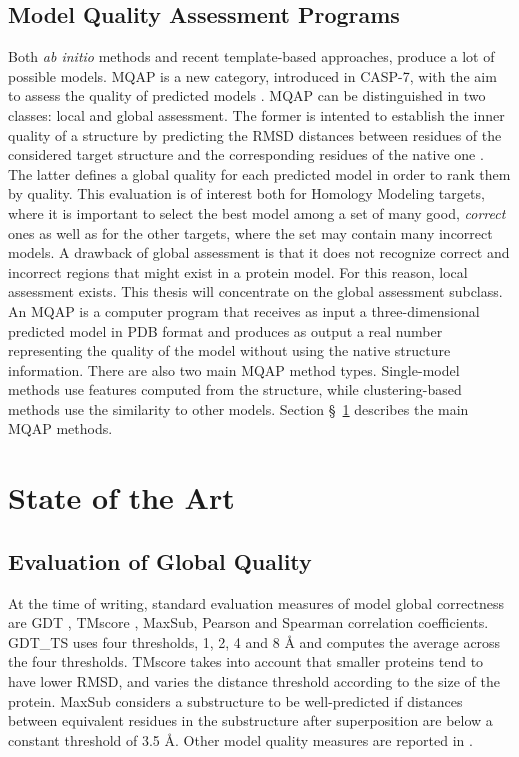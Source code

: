\subsection{Model Quality Assessment Programs}
\label{subsec:model_quality_assessment_programs}
Both \emph{ab initio} methods and recent template-based approaches, produce a lot of possible models. \gls{MQAP} is a new category, introduced in CASP-7, with the aim to assess the quality of predicted models \cite{Cozzetto2007aa}. MQAP can be distinguished in two classes: local and global assessment. The former is intented to establish the inner quality of a structure by predicting the RMSD distances between residues of the considered target structure and the corresponding residues of the native one \cite{DeRonne2008aa, Fasnacht2007aa}. The latter defines a global quality for each predicted model in order to rank them by quality. This evaluation is of interest both for Homology Modeling targets, where it is important to select the best model among a set of many good, \emph{correct} ones as well as for the other targets, where the set may contain many incorrect models. A drawback of global assessment is that it does not recognize correct and incorrect regions that might exist in a protein model. For this reason, local assessment exists. This thesis will concentrate on the global assessment subclass. An MQAP is a computer program that receives as input a three-\-di\-men\-sio\-nal predicted model in PDB format and produces as output a real number representing the quality of the model without using the native structure information. There are also two main MQAP method types. Single-model methods use features computed from the structure, while clustering-based methods use the similarity to other models. Section \S~\ref{sec:state_of_the_art} describes the main MQAP methods.\\


\section{State of the Art}
\label{sec:state_of_the_art}

\subsection{Evaluation of Global Quality}
\label{subsec:evaluation_of_global_quality}
At the time of writing, standard evaluation measures of model global correctness are \gls{GDT} \cite{Zemla2001aa}, TMscore \cite{Zhang2004}, MaxSub\cite{Siew2000}, Pearson and Spearman correlation coefficients. GDT\_TS uses four thresholds, 1, 2, 4 and 8 \AA{} and computes the average across the four thresholds. TMscore takes into account that smaller proteins tend to have lower RMSD, and varies the distance threshold according to the size of the protein. MaxSub considers a substructure to be well-predicted if distances between equivalent residues in the substructure after superposition are below a constant threshold of 3.5 \AA{}. Other model quality measures are reported in \cite{Cristobal2001aa}.


